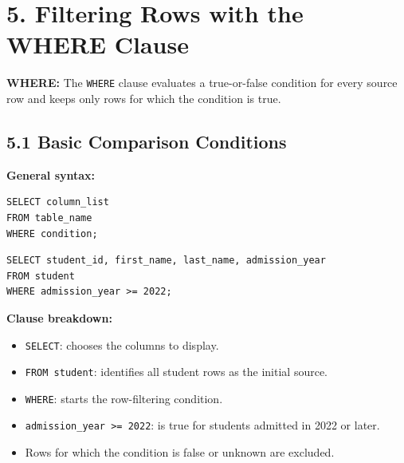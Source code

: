 \documentclass[12pt,a4paper]{article}
\newcommand{\defbox}[2]{%
  \vspace{0.2cm}
  \noindent\colorbox{boxgray}{\parbox{\dimexpr\linewidth-2\fboxsep}{%
    \textbf{#1:} #2
  }}
  \vspace{0.2cm}
}
\begin{document}
\section*{5. Filtering Rows with the WHERE Clause}
\defbox{WHERE}{The \texttt{WHERE} clause evaluates a true-or-false condition for every source row
and keeps only rows for which the condition is true.}

\subsection*{5.1 Basic Comparison Conditions}
\noindent\textbf{General syntax:}
\begin{verbatim}
SELECT column_list
FROM table_name
WHERE condition;
\end{verbatim}

\begin{verbatim}
SELECT student_id, first_name, last_name, admission_year
FROM student
WHERE admission_year >= 2022;
\end{verbatim}

\noindent\textbf{Clause breakdown:}
\begin{itemize}
    \item \texttt{SELECT}: chooses the columns to display.
    \item \texttt{FROM student}: identifies all student rows as the initial source.
    \item \texttt{WHERE}: starts the row-filtering condition.
    \item \texttt{admission\_year >= 2022}: is true for students admitted in 2022 or later.
    \item Rows for which the condition is false or unknown are excluded.
\end{itemize}
\end{document}
